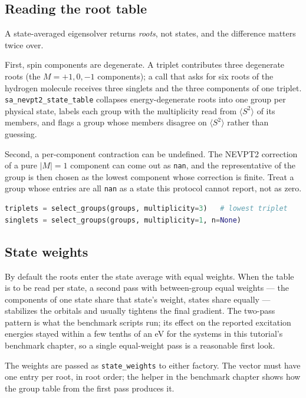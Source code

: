 \subsection{Reading the root table}

A state-averaged eigensolver returns \emph{roots}, not states, and the
difference matters twice over.

First, spin components are degenerate.  A triplet contributes three
degenerate roots (the $M = +1, 0, -1$ components); a call that asks
for six roots of the hydrogen molecule receives three singlets and the
three components of one triplet.  \texttt{sa\_nevpt2\_state\_table}
collapses energy-degenerate roots into one group per physical state,
labels each group with the multiplicity read from $\langle S^2 \rangle$
of its members, and flags a group whose members disagree on
$\langle S^2 \rangle$ rather than guessing.

Second, a per-component contraction can be undefined.  The NEVPT2
correction of a pure $|M| = 1$ component can come out as \texttt{nan},
and the representative of the group is then chosen as the lowest
component whose correction is finite.  Treat a group whose entries are
all \texttt{nan} as a state this protocol cannot report, not as zero.

\begin{lstlisting}[language=Python]
triplets = select_groups(groups, multiplicity=3)   # lowest triplet
singlets = select_groups(groups, multiplicity=1, n=None)
\end{lstlisting}

\subsection{State weights}

By default the roots enter the state average with equal weights.  When
the table is to be read per state, a second pass with between-group
equal weights --- the components of one state share that state's
weight, states share equally --- stabilizes the orbitals and usually
tightens the final gradient.  The two-pass pattern is what the
benchmark scripts run; its effect on the reported excitation energies
stayed within a few tenths of an eV for the systems in this
tutorial's benchmark chapter, so a single equal-weight pass is a
reasonable first look.

The weights are passed as \texttt{state\_weights} to either factory.
The vector must have one entry per root, in root order; the helper in
the benchmark chapter shows how the group table from the first pass
produces it.
